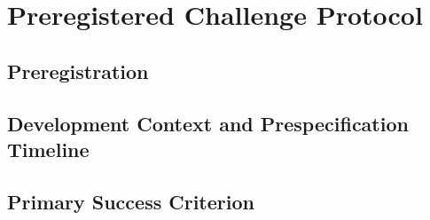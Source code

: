 
\section{Preregistered Challenge Protocol}
\label{sec:protocol}

\subsection{Preregistration}

\subsection{Development Context and Prespecification Timeline}

\subsection{Primary Success Criterion}

